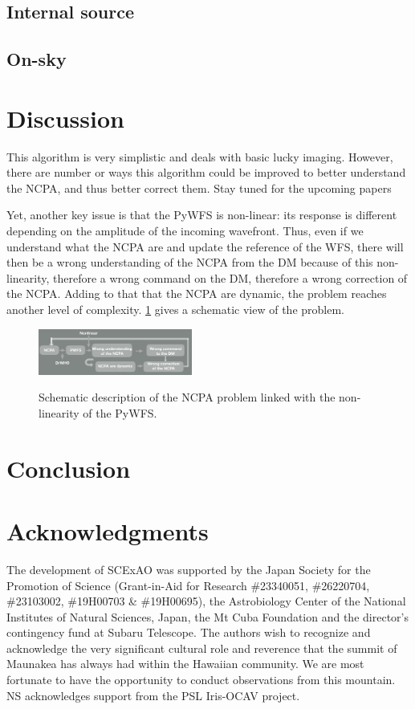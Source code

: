 \documentclass[twocolumn]{aastex62}
\begin{document}
\subsection{Internal source}
\subsection{On-sky}


\section{Discussion}
This algorithm is very simplistic and deals with basic lucky imaging. However, there are number or ways this algorithm could be improved to better understand the NCPA, and thus better correct them. Stay tuned for the upcoming papers 

Yet, another key issue is that the PyWFS is non-linear: its response is different depending on the amplitude of the incoming wavefront. Thus, even if we understand what the NCPA are and update the reference of the WFS, there will then be a wrong understanding of the NCPA from the DM because of this non-linearity, therefore a wrong command on the DM, therefore a wrong correction of the NCPA. Adding to that that the NCPA are dynamic, the problem reaches another level of complexity. \ref{fig:pyr_ncpa_pb} gives a schematic view of the problem. 

\begin{figure}[h!]
  \centering
    \includegraphics[width=0.45\textwidth]{fig/pyr_ncpa_pb.png}\
      \caption{Schematic description of the NCPA problem linked with the non-linearity of the PyWFS.}
    \label{fig:pyr_ncpa_pb}
\end{figure}

\section{Conclusion}



\section{Acknowledgments}
The development of SCExAO was supported by the Japan Society for the Promotion of Science (Grant-in-Aid for Research \#23340051, \#26220704, \#23103002, \#19H00703 \& \#19H00695), the Astrobiology Center of the National Institutes of Natural Sciences, Japan, the Mt Cuba Foundation and the director's contingency fund at Subaru Telescope. The authors wish to recognize and acknowledge the very significant cultural role and reverence that the summit of Maunakea has always had within the Hawaiian community. We are most fortunate to have the opportunity to conduct observations from this mountain. NS acknowledges support from the PSL Iris-OCAV project. 


\newpage


\end{document}

